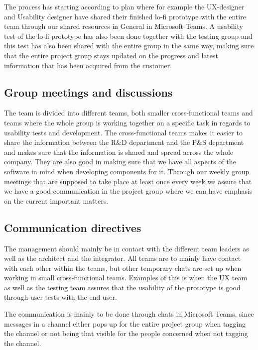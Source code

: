  The process has starting according to plan where for example the UX-designer and Usability designer have shared their finished lo-fi prototype with the entire team through our shared resources in General in Microsoft Teams. A usability test of the lo-fi prototype has also been done together with the testing group and this test has also been shared with the entire group in the same way, making sure that the entire project group stays updated on the progress and latest information that has been acquired from the customer. 
 
    \subsection{Group meetings and discussions}
The team is divided into different teams, both smaller cross-functional teams and teams where the whole group is working together on a specific task in regards to usability tests and development. The cross-functional teams makes it easier to share the information between the R\&D department and the P\&S department and makes sure that the information is shared and spread across the whole company. They are also good in making sure that we have all aspects of the software in mind when developing components for it. Through our weekly group meetings that are supposed to take place at least once every week we assure that we have a good communication in the project group where we can have emphasis on the current important matters.

    \subsection{Communication directives}


The management should mainly be in contact with the different team leaders as well as the architect and the integrator. All teams are to mainly have contact with each other within the teams, but other temporary chats are set up when working in small cross-functional teams. Examples of this is when the UX team as well as the testing team assures that the usability of the prototype is good through user tests with the end user. 

The communication is mainly to be done through chats in Microsoft Teams, since messages in a channel either pops up for the entire project group when tagging the channel or not being that visible for the people concerned when not tagging the channel.

